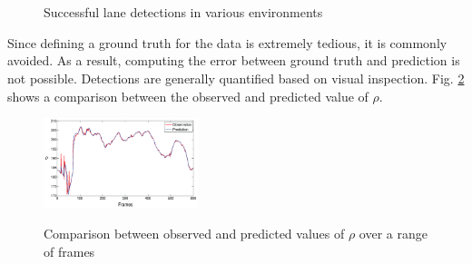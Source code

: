 \documentclass{article}
\begin{document}
\begin{figure}[htb!]
  \centering
  \hspace{0.00001in}
  \\
  \hspace{0.00001in}
  \\
  \caption{Successful lane detections in various environments}
  \label{fig:lane_detection}
\end{figure}
Since defining a ground truth for the data is extremely tedious, it is commonly avoided. As a result, computing the error between ground truth and prediction is not possible. Detections are generally quantified based on visual inspection. Fig. \ref{fig:obs_pred_kalman} shows a comparison between the observed and predicted value of $\rho$.
\begin{figure}[htb!]
  \centering
  \includegraphics[width=0.4\textwidth]{IMG/obs_pred_rho_crop.png}\\
  \caption{Comparison between observed and predicted values of $\rho$ over a range of frames}
  \label{fig:obs_pred_kalman}
\end{figure}
\end{document}
